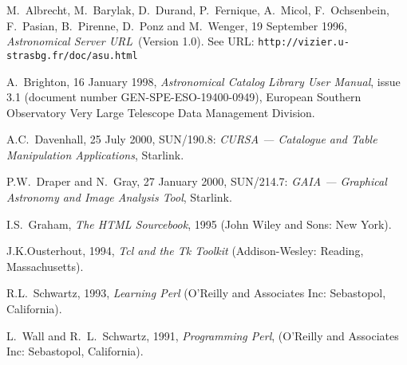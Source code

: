 \documentclass[twoside,11pt]{article}
\newcommand{\htmladdnormallink}[2]{#1}
\newcommand{\xref}[3]{#1}
\renewcommand{\_}{\texttt{\symbol{95}}}
\begin{document}
\newpage
{}
\begin{thebibliography}{99}

   M.~Albrecht, M.~Barylak, D.~Durand, P.~Fernique, 
   A.~Micol, F.~Ochsenbein, F.~Pasian, B.~Pirenne, D.~Ponz and 
   M.~Wenger, 19 September 1996, {\it Astronomical Server URL}\,
   (Version 1.0).  See URL: \htmladdnormallink{
   {\tt http://vizier.u-strasbg.fr/doc/asu.html}}
   {http://vizier.u-strasbg.fr/doc/asu.html}

   A.~Brighton, 16 January 1998, {\it Astronomical
   Catalog Library User Manual}, issue 3.1 (document number
   GEN-SPE-ESO-19400-0949), European Southern Observatory Very Large
   Telescope Data Management Division.

   A.C.~Davenhall, 25 July 2000,
   \xref{SUN/190.8}{sun190}{}: {\it CURSA --- Catalogue and Table
    Manipulation Applications}, Starlink.

   P.W.~Draper and N.~Gray, 27 January 2000,
   \xref{SUN/214.7}{sun214}{}: {\it GAIA --- Graphical Astronomy and
   Image Analysis Tool}, Starlink.

   I.S.~Graham, {\it The HTML Sourcebook}, 1995 (John
   Wiley and Sons: New York).

   J.K.Ousterhout, 1994, {\it Tcl and the Tk
   Toolkit}\/ (Addison-Wesley: Reading, Massachusetts).

   R.L.~Schwartz, 1993, {\it Learning Perl}
   (O'Reilly and Associates Inc: Sebastopol, California).

   L.~Wall and R.~L.~Schwartz, 1991, {\it Programming
   Perl}, (O'Reilly and Associates Inc: Sebastopol, California).

\end{thebibliography}

\typeout{  }
\typeout{*****************************************************}
\typeout{  }
\typeout{  }
\typeout{*****************************************************}
\typeout{  }
\end{document}
